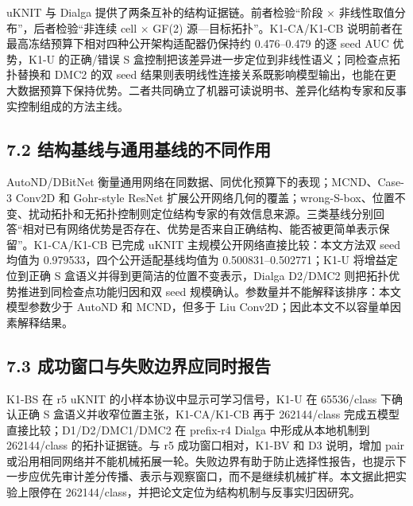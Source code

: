 \documentclass[
  a4paper,
  UTF8]{ctexart}
\begin{document}
uKNIT 与 Dialga 提供了两条互补的结构证据链。前者检验``阶段 ×
非线性取值分布''，后者检验``非连续 cell × GF(2)
源---目标拓扑''。K1-CA/K1-CB
说明前者在最高冻结预算下相对四种公开架构适配器仍保持约 0.476--0.479 的逐
seed AUC 优势，K1-U
的正确/错误 S 盒控制把该差异进一步定位到非线性语义；同检查点拓扑替换和
DMC2 的双 seed
结果则表明线性连接关系既影响模型输出，也能在更大数据预算下保持优势。二者共同确立了机器可读说明书、差异化结构专家和反事实控制组成的方法主线。

\hypertarget{ux7ed3ux6784ux57faux7ebfux4e0eux901aux7528ux57faux7ebfux7684ux4e0dux540cux4f5cux7528}{%
\subsection{7.2
结构基线与通用基线的不同作用}\label{ux7ed3ux6784ux57faux7ebfux4e0eux901aux7528ux57faux7ebfux7684ux4e0dux540cux4f5cux7528}}

AutoND/DBitNet 衡量通用网络在同数据、同优化预算下的表现；MCND、Case-3
Conv2D 和 Gohr-style ResNet
扩展公开网络几何的覆盖；wrong-S-box、位置不变、扰动拓扑和无拓扑控制则定位结构专家的有效信息来源。三类基线分别回答``相对已有网络优势是否存在、优势是否来自正确结构、能否被更简单表示保留''。K1-CA/K1-CB
已完成 uKNIT 主规模公开网络直接比较：本文方法双 seed 均值为
0.979533，四个公开适配基线均值为 0.500831--0.502771；K1-U
将增益定位到正确 S 盒语义并得到更简洁的位置不变表示，Dialga D2/DMC2
则把拓扑优势推进到同检查点功能归因和双 seed
规模确认。参数量并不能解释该排序：本文模型参数少于 AutoND 和
MCND，但多于 Liu Conv2D；因此本文不以容量单因素解释结果。

\hypertarget{ux6210ux529fux7a97ux53e3ux4e0eux5931ux8d25ux8fb9ux754cux5e94ux540cux65f6ux62a5ux544a}{%
\subsection{7.3
成功窗口与失败边界应同时报告}\label{ux6210ux529fux7a97ux53e3ux4e0eux5931ux8d25ux8fb9ux754cux5e94ux540cux65f6ux62a5ux544a}}

K1-BS 在 r5 uKNIT 的小样本协议中显示可学习信号，K1-U 在 65536/class
下确认正确 S 盒语义并收窄位置主张，K1-CA/K1-CB 再于 262144/class
完成五模型直接比较；D1/D2/DMC1/DMC2 在 prefix-r4 Dialga
中形成从本地机制到 262144/class 的拓扑证据链。与 r5
成功窗口相对，K1-BV 和 D3 说明，增加 pair
或沿用相同网络并不能机械拓展一轮。失败边界有助于防止选择性报告，也提示下一步应优先审计差分传播、表示与观察窗口，而不是继续机械扩样。本文据此把实验上限停在
262144/class，并把论文定位为结构机制与反事实归因研究。
\end{document}
